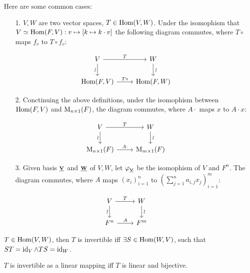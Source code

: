 Here are some common cases:
\begin{enumerate}
    \item[1.] $V, W$ are two vector spaces, $T \in \operatorname{Hom}(V, W)$. Under the isomophism that $V \simeq \operatorname{Hom}(F, V): v \mapsto [k \mapsto k \cdot v]$ the following diagram commutes, where $T \circ$ maps $f_v$ to $T \circ f_v$:
\end{enumerate}
\[
    \begin{tikzcd}
        V  \arrow[r, "T"] \arrow[d, "\sim"', sloped]
        & W \arrow[d, "\sim", sloped]
        \\
        \Hom(F, V)  \arrow[r, "T \circ"]
        & \Hom(F, W)
    \end{tikzcd}
\]
\begin{enumerate}
    \item[2.] Conctinuing the above definitions, under the isomophism between $\operatorname{Hom}(F, V)$ and $\mathrm{M}_{n \times 1}(F)$, the diagram commutes, where $A\cdot$ maps $x$ to $A \cdot x$:
\end{enumerate}
\[
    \begin{tikzcd}
        V  \arrow[r, "T"] \arrow[d, "\sim"', sloped]
        & W \arrow[d, "\sim", sloped]
        \\
        \Mat_{n \times 1}(F)  \arrow[r, "A \cdot"]
        & \Mat_{m \times 1}(F)
    \end{tikzcd}
\]

\begin{enumerate}
    \item[3.] Given basis $\bs{V}{}$ and $\bs{W}{}$ of $V, W$, let $\varphi_{\bss{V}{}}$ be the isomophism of $V$ and $F^n$. The diagram commutes, where $A$ maps $(x_i)_{i=1}^n$ to $(\sum_{j=1}^n a_{i,j} x_j)_{i=1}^m$:
\end{enumerate}
\[
    \begin{tikzcd}
        V  \arrow[r, "T"] \arrow[d, "\sim"', sloped]
        & W \arrow[d, "\sim", sloped]
        \\
        F^n  \arrow[r, "A"]
        & F^m
    \end{tikzcd}
\]





\begin{definition}
    $T \in \operatorname{Hom}(V, W)$, then $T$ is invertible iff $\exists S \in \operatorname{Hom}(W, V)$, such that $ST = \operatorname{id}_{V} \land TS=\operatorname{id}_{W}$.
\end{definition}
\begin{proposition}
    $T$ is invertible as a linear mapping iff $T$ is linear and bijective. 
\end{proposition}






